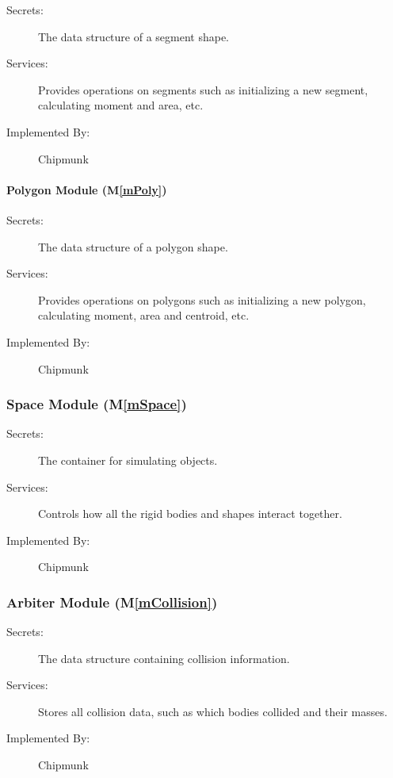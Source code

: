 \documentclass[12pt]{article}
\newcommand{\mref}[1]{M\ref{#1}}
\begin{document}
\begin{description}
	\item[Secrets:] The data structure of a segment shape.
	\item[Services:] Provides operations on segments such as initializing a new segment, calculating moment and area, etc.
	\item[Implemented By:] Chipmunk
\end{description}

\paragraph{Polygon Module (\mref{mPoly})}

\begin{description}
	\item[Secrets:] The data structure of a polygon shape.
	\item[Services:] Provides operations on polygons such as initializing a new polygon, calculating moment, area and centroid, etc.
	\item[Implemented By:] Chipmunk
\end{description}

\subsubsection{Space Module (\mref{mSpace})}

\begin{description}
	\item[Secrets:] The container for simulating objects.
	\item[Services:]Controls how all the rigid bodies and shapes interact together.
	\item[Implemented By:] Chipmunk
\end{description} 

\subsubsection{Arbiter Module (\mref{mCollision})}

\begin{description}
\item[Secrets:]The data structure containing collision information.
\item[Services:]Stores all collision data, such as which bodies 
collided and their masses.
\item[Implemented By:] Chipmunk
\end{description}
 
\end{document}
